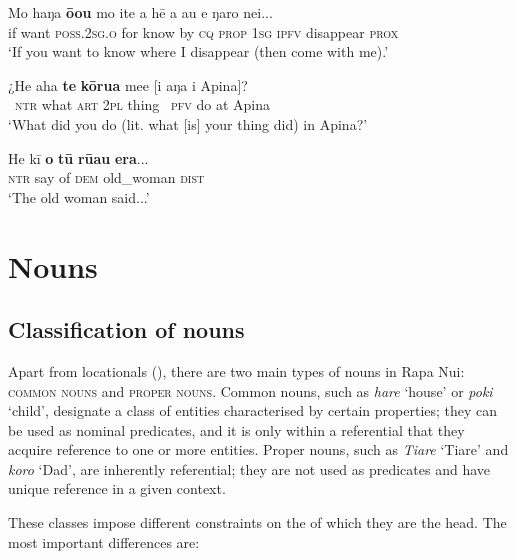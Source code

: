 \ea\label{ex:3.62}
\gll Mo haŋa \textbf{ō{\ꞌ}ou} mo {\ꞌ}ite a hē a au e ŋaro nei...\\
if want \textsc{poss.2sg.o} for know by \textsc{cq} \textsc{prop} \textsc{1sg} \textsc{ipfv} disappear \textsc{prox}\\

\glt 
‘If you want to know where I disappear (then come with me).’ \textstyleExampleref{[R212.010]} 
\z

\ea\label{ex:3.63}
\gll ¿He aha \textbf{te} \textbf{kōrua} me{\ꞌ}e [i aŋa {\ꞌ}i {\ꞌ}Apina]? \\
~\textsc{ntr} what \textsc{art} \textsc{2pl} thing \textsc{~pfv} do at Apina \\

\glt 
‘What did you do (lit. what [is] your thing did) in Apina?’ \textstyleExampleref{[R301.197]} 
\z

\ea\label{ex:3.64}
\gll He kī \textbf{o} \textbf{tū} \textbf{rū{\ꞌ}au} \textbf{era}...\\
\textsc{ntr} say of \textsc{dem} old\_woman \textsc{dist}\\

\glt 
‘The old woman said...’ \textstyleExampleref{[R313.171]} 
\z

\section{Nouns}\label{sec:3.3}
\subsection{Classification of nouns}\label{sec:3.3.1}
Apart from locationals (), there are two main types of nouns in Rapa Nui: \textsc{common nouns} and \textsc{proper nouns}. Common nouns, such as \textit{hare} ‘house’ or \textit{poki} ‘child’, designate a class of entities characterised by certain properties; they can be used as nominal predicates, and it is only within a referential  that they acquire reference to one or more entities. Proper nouns, such as \textit{Tiare} ‘Tiare’ and \textit{koro} ‘Dad’, are inherently referential; they are not used as predicates and have unique reference in a given context.

These classes impose different constraints on the  of which they are the head. The most important differences are:

